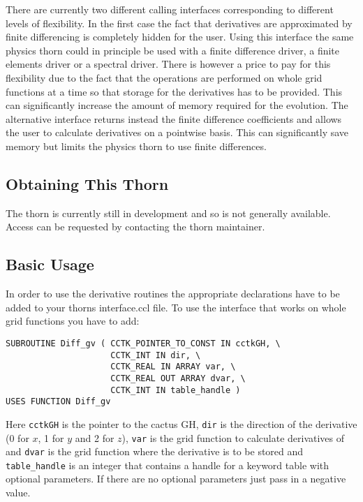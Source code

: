 There are currently two different calling interfaces corresponding to different
levels of flexibility. In the first case the fact that derivatives are
approximated by finite differencing is completely hidden for the user. Using
this interface the same physics thorn could in principle be used with a
finite difference driver, a finite elements driver or a spectral driver. There
is however a price to pay for this flexibility due to the fact that the
operations are performed on whole grid functions at a time so that storage
for the derivatives has to be provided. This can significantly increase the
amount of memory required for the evolution. The alternative interface
returns instead the finite difference coefficients and allows the user to
calculate derivatives on a pointwise basis. This can significantly save
memory but limits the physics thorn to use finite differences.
\subsection{Obtaining This Thorn}
The thorn is currently still in development and so is not generally available.
Access can be requested by contacting the thorn maintainer.
\subsection{Basic Usage}
In order to use the derivative routines the appropriate declarations have 
to be added to your thorns interface.ccl file. To use the interface that
works on whole grid functions you have to add:
\begin{verbatim}
SUBROUTINE Diff_gv ( CCTK_POINTER_TO_CONST IN cctkGH, \
                     CCTK_INT IN dir, \
                     CCTK_REAL IN ARRAY var, \
                     CCTK_REAL OUT ARRAY dvar, \
                     CCTK_INT IN table_handle )
USES FUNCTION Diff_gv
\end{verbatim}
Here {\tt cctkGH} is the pointer to the cactus GH, {\tt dir} is the direction
of the derivative (0 for $x$, 1 for $y$ and 2 for $z$), {\tt var} is the grid
function to calculate derivatives of and {\tt dvar} is the grid function where
the derivative is to be stored and {\tt table\_handle} is an integer that
contains a handle for a keyword table with optional parameters. If there are
no optional parameters just pass in a negative value.

